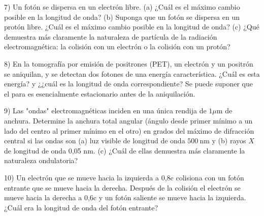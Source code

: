 7) Un fotón se dispersa en un electrón libre. (a) ¿Cuál es el máximo cambio posible en la longitud de onda? (b) Suponga que un fotón se dispersa en un protón libre. ¿Cuál es el máximo cambio posible en la longitud de onda? (c) ¿Qué demuestra más claramente la naturaleza de partícula de la radiación electromagnética: la colisión con un electrón o la colisión con un protón?

8) En la tomografía por emisión de positrones (PET), un electrón y un positrón se aniquilan, y se detectan dos fotones de una energía característica. ¿Cuál es esta energía? y ¿¿cuál es la longitud de onda correspondiente? Se puede suponer que el para es esencialmente estacionario antes de la aniquilación.

9) Las "ondas" electromagnéticas inciden en una única rendija de $1 \mu \mathrm{m}$ de anchura. Determine la anchura total angular (ángulo desde primer mínimo a un lado del centro al primer mínimo en el otro) en grados del máximo de difracción central si las ondas son (a) luz visible de longitud de onda $500 \mathrm{~nm}$ y (b) rayos $X$ de longitud de onda 0,05 $\mathrm{nm}$. (c) ¿Cuál de ellas demuestra más claramente la naturaleza ondulatoria?

10) Un electrón que se mueve hacia la izquierda a 0,8c colisiona con un fotón entrante que se mueve hacia la derecha. Después de la colisión el electrón se mueve hacia la derecha a 0,6c y un fotón saliente se mueve hacia la izquierda. ¿Cuál era la longitud de onda del fotón entrante?



%
%

